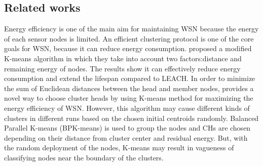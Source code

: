 \documentclass[11pt]{report}
\begin{document}
    \subsection{Related works}
	Energy efficiency is one of the main aim for maintaining WSN because the energy of each sensor nodes is limited. An efficient clustering protocol is one of the core goals for WSN, because it can reduce energy consumption. \cite{randhawa2016performance} proposed a modified K-means algorithm in which they take into account two factors:distance and remaining energy of nodes. The results show it can effectively reduce energy consumption and extend the lifespan compared to LEACH. In order to minimize the sum of Euclidean distances between the head and member nodes, \cite{6550511} provides a novel way to choose cluster heads by using K-means method for maximizing the energy efficiency of WSN. However, this algorithm may cause different kinds of clusters in different runs based on the chosen initial centroids randomly. Balanced Parallel K-means (BPK-means) \cite{4622679} is used to group the nodes and CHs are chosen depending on their distance from cluster center and residual energy. But, with the random deployment of the nodes, K-means may result in vagueness of classifying nodes near the boundary of the clusters. \\ 
	
\end{document}
